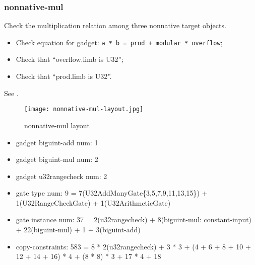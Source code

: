 \subsubsection{nonnative-mul}

Check the multiplication relation among three nonnative target objects.

\begin{itemize}
    \item Check equation for gadget: \verb|a * b = prod + modular * overflow|;
    \item Check that ``overflow.limb is U32'';
    \item Check that ``prod.limb is U32''.
\end{itemize}

See .
\begin{figure}[!ht]
    \centering
    \texttt{[image: nonnative-mul-layout.jpg]}
    \caption{nonnative-mul layout}
    \label{fig:nonnative-mul-layout}
\end{figure}

\begin{itemize}
    \item gadget biguint-add num: 1
    \item gadget biguint-mul num: 2
    \item gadget u32rangecheck num: 2
    \item gate type num: 9 = 7(U32AddManyGate\{3,5,7,9,11,13,15\}) + 1(U32RangeCheckGate) + 1(U32ArithmeticGate)
    \item gate instance num: 37 = 2(u32rangecheck) + 8(biguint-mul: constant-input) + 22(biguint-mul) + 1 + 3(biguint-add)
    \item copy-constraints: 583 = 8 * 2(u32rangecheck) + 3 * 3 + (4 + 6 + 8 + 10 + 12 + 14 + 16) * 4 + (8 * 8) * 3 + 17 * 4 + 18
\end{itemize}
